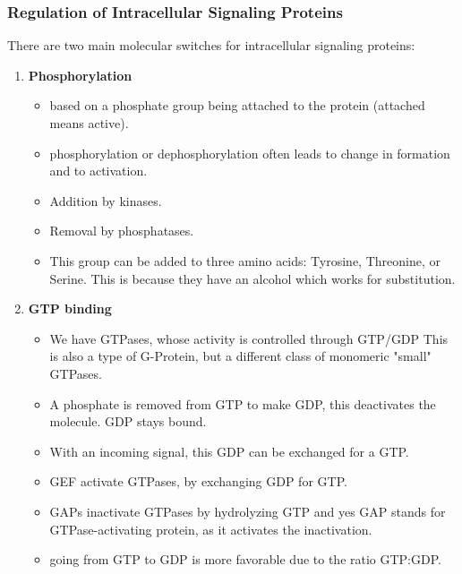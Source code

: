 \documentclass[../main.tex]{subfiles}
\begin{document}
\subsubsection{Regulation of Intracellular Signaling Proteins}
\label{sec:GTP}

There are two main molecular switches for intracellular signaling proteins:
\begin{enumerate}
	\item \textbf{Phosphorylation} 
	\begin{itemize}
		\item based on a phosphate group being attached to the protein (attached means active).
		\item phosphorylation or dephosphorylation often leads to change in formation and to activation.
		\item Addition by kinases.
		\item Removal by phosphatases.
		\item This group can be added to three amino acids: Tyrosine, Threonine, or Serine. This is because they have an alcohol which works for substitution.
	\end{itemize}
	\item \textbf{GTP binding}
	\begin{itemize}
		\item We have GTPases, whose activity is controlled through GTP/GDP This is also a type of G-Protein, but a different class of monomeric "small" GTPases.
		\item A phosphate is removed from GTP to make GDP, this deactivates the molecule. GDP stays bound.
		\item With an incoming signal, this GDP can be exchanged for a GTP.
		\item GEF activate GTPases, by exchanging GDP for GTP.
		\item GAPs inactivate GTPases by hydrolyzing GTP and yes GAP stands for GTPase-activating protein, as it activates the inactivation.
		\item going from GTP to GDP is more favorable due to the ratio GTP:GDP.
	\end{itemize}
\end{enumerate}
	
\end{document}
